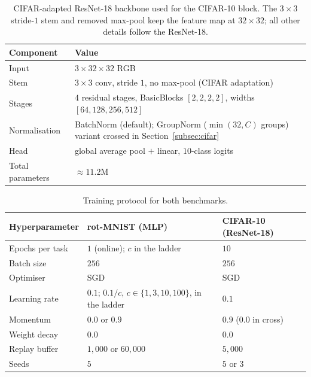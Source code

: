 \begin{table}[H]
    \centering
    \small
    \begin{tabular}{@{}l p{}@{}}
        \hline
        Component        & Value                                                                                               \\
        \hline
        Input            & $3\times32\times32$ RGB                                                                             \\
        Stem             & $3\times3$ conv, stride $1$, no max-pool (CIFAR adaptation)                                         \\
        Stages           & $4$ residual stages, BasicBlocks $[2,2,2,2]$, widths $[64,128,256,512]$                             \\
        Normalisation    & BatchNorm (default); GroupNorm ($\min(32, C)$ groups) variant crossed in Section~\ref{subsec:cifar} \\
        Head             & global average pool $+$ linear, $10$-class logits                                                   \\
        Total parameters & ${\approx}11.2$M                                                                                    \\
        \hline
    \end{tabular}
    \caption{CIFAR-adapted ResNet-18 backbone used for the CIFAR-10 block. The $3\times3$ stride-$1$ stem and removed max-pool keep the feature map at $32\times32$; all other details follow the ResNet-18.}
    \label{tab:resnet}
\end{table}

\begin{table}[H]
    \centering
    \small
    \begin{tabular}{@{}l p{} p{}@{}}
        \hline
        Hyperparameter  & rot-MNIST (MLP)         & CIFAR-10 (ResNet-18)   \\
        \hline
        Epochs per task & $1$ (online); $c$ in the ladder & $10$           \\
        Batch size      & $256$                   & $256$                  \\
        Optimiser       & SGD                     & SGD                    \\
        Learning rate   & $0.1$; $0.1/c$, $c \in \{1,3,10,100\}$, in the ladder & $0.1$ \\
        Momentum        & $0.0$ or $0.9$          & $0.9$ ($0.0$ in cross) \\
        Weight decay    & $0.0$                   & $0.0$                  \\
        Replay buffer   & $1{,}000$ or $60{,}000$ & $5{,}000$              \\
        Seeds           & $5$                     & $5$ or $3$             \\
        \hline
    \end{tabular}
    \caption{Training protocol for both benchmarks.}
    \label{tab:training}
\end{table}

